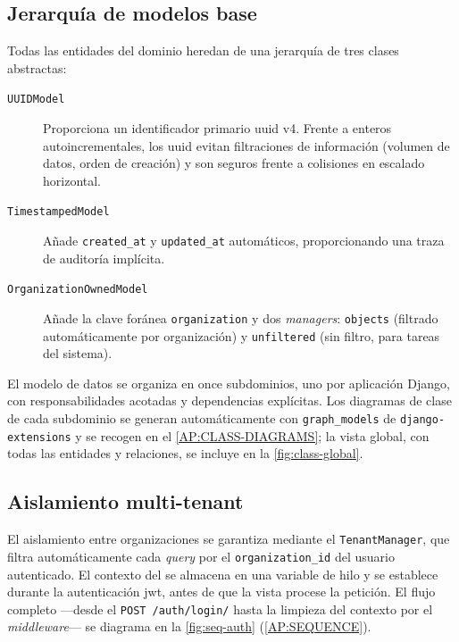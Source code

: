 \subsection{Jerarquía de modelos base}
\label{SS:DES-MODEL-STRUCTURE}

Todas las entidades del dominio heredan de una jerarquía de tres clases
abstractas:

\begin{description}
  \item[\texttt{UUIDModel}] Proporciona un identificador primario
  \acs{uuid} v4. Frente a enteros autoincrementales, los \acs{uuid}
  evitan filtraciones de información (volumen de datos, orden de
  creación) y son seguros frente a colisiones en escalado horizontal.

  \item[\texttt{TimestampedModel}] Añade \texttt{created\_at} y
  \texttt{updated\_at} automáticos, proporcionando una traza de auditoría
  implícita.

  \item[\texttt{OrganizationOwnedModel}] Añade la clave foránea
  \texttt{organization} y dos \textit{managers}: \texttt{objects}
  (filtrado automáticamente por organización) y \texttt{unfiltered}
  (sin filtro, para tareas del sistema).
\end{description}

El modelo de datos se organiza en once subdominios, uno por aplicación
Django, con responsabilidades acotadas y dependencias explícitas. Los
diagramas de clase de cada subdominio se generan automáticamente con
\texttt{graph\_models} de \texttt{django-extensions} y se recogen en el
\cref{AP:CLASS-DIAGRAMS}; la vista global, con todas las entidades y
relaciones, se incluye en la \cref{fig:class-global}.


\subsection{Aislamiento multi-tenant}
\label{SS:DES-MODEL-ISOLATION}

El aislamiento entre organizaciones se garantiza mediante el
\texttt{TenantManager}, que filtra automáticamente cada \textit{query}
por el \texttt{organization\_id} del usuario autenticado. El contexto
del  se almacena en una variable de hilo y se establece
durante la autenticación \acs{jwt}, antes de que la vista procese la
petición. El flujo completo —desde el \texttt{POST /auth/login/} hasta
la limpieza del contexto por el \textit{middleware}— se diagrama en la
\cref{fig:seq-auth} (\cref{AP:SEQUENCE}).

